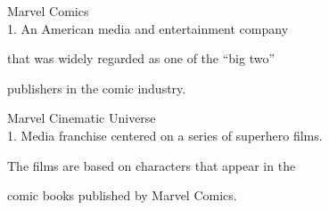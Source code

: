 \documentclass{beamer}
\begin{document}
\begin{frame}
    \hspace{.8cm} \LARGE{Marvel Comics} \\

    \hspace{.8cm} \normalsize{1. An American media and entertainment company}

    \hspace{1cm}\normalsize{that was widely regarded as one of the “big two”}

    \hspace{1cm}\normalsize{publishers in the comic industry.}
\end{frame}

\begin{frame}
    \hspace{.8cm} \LARGE{Marvel Cinematic Universe} \\

    \hspace{.8cm} \normalsize{1. Media franchise centered on a series of superhero films.}

    \hspace{1cm}\normalsize{The films are based on characters that appear in the}

    \hspace{1cm}\normalsize{comic books published by Marvel Comics.}
\end{frame}
\end{document}
